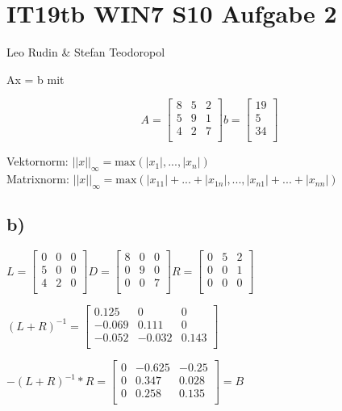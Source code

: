 \documentclass{article}
\begin{document}
\section*{IT19tb WIN7 S10 Aufgabe 2}
Leo Rudin \& Stefan Teodoropol

Ax = b mit

\[
A =
\begin{bmatrix} 
8 & 5 & 2 \\
5 & 9 & 1 \\
4 & 2 & 7 \\
\end{bmatrix}
b =
\begin{bmatrix} 
19 \\
5 \\
34 \\
\end{bmatrix}
\]

Vektornorm: \(||x||_\infty = \text{max}(|x_1|,...,|x_n|)\)\\
Matrixnorm: \(||x||_\infty = \text{max}(|x_{11}|+...+|x_{1n}|,...,|x_{n1}|+...+|x_{nn}|)\)

\subsection*{b)}

\(
L = 
\begin{bmatrix} 
0 & 0 & 0 \\
5 & 0 & 0 \\
4 & 2 & 0 \\
\end{bmatrix}
D =
\begin{bmatrix} 
8 & 0 & 0 \\
0 & 9 & 0 \\
0 & 0 & 7 \\
\end{bmatrix}
R =
\begin{bmatrix} 
0 & 5 & 2 \\
0 & 0 & 1 \\
0 & 0 & 0 \\
\end{bmatrix}
\)

\(
(L+R)^{-1} =
\begin{bmatrix} 
0.125 & 0 & 0 \\
-0.069 & 0.111 & 0 \\
-0.052 & -0.032 & 0.143 \\
\end{bmatrix}
\)

\(
-(L+R)^{-1} * R = 
\begin{bmatrix} 
0 & -0.625 & -0.25 \\
0 & 0.347 & 0.028 \\
0 & 0.258 & 0.135 \\
\end{bmatrix}
=
B
\)
\end{document}
